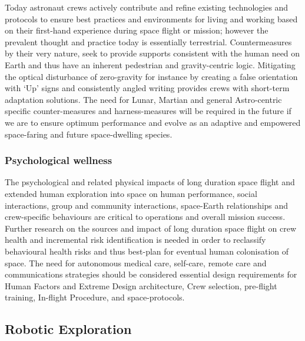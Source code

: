 \documentclass[letter,11pt]{article}
\begin{document}
Today astronaut crews actively contribute and refine existing technologies and
protocols to ensure best practices and environments for living and working
based on their first-hand experience during space flight or mission; however
the prevalent thought and practice today is essentially terrestrial.
Countermeasures by their very nature, seek to provide supports consistent with
the human need on Earth and thus have an inherent pedestrian and
gravity-centric logic. Mitigating the optical disturbance of zero-gravity for
instance by creating a false orientation with `Up' signs and consistently
angled writing provides crews with short-term adaptation solutions. The need
for Lunar, Martian and general Astro-centric specific counter-measures and
harness-measures will be required in the future if we are to ensure optimum
performance and evolve as an adaptive and empowered space-faring and future
space-dwelling species.

 
\subsubsection*{Psychological wellness}

The psychological and related physical impacts of long duration space flight
and extended human exploration into space on human performance, social
interactions, group and community interactions, space-Earth relationships and
crew-specific behaviours are critical to operations and overall mission
success. Further research on the sources and impact of long duration space
flight on crew health and incremental risk identification is needed in order to
reclassify behavioural health risks and thus best-plan for eventual human
colonisation of space. The need for autonomous medical care, self-care, remote
care and communications strategies should be considered essential design
requirements for Human Factors and Extreme Design architecture, Crew selection,
pre-flight training, In-flight Procedure, and space-protocols.  

\subsection{Robotic Exploration}
\label{ps-robotic-exploration}
\end{document}
